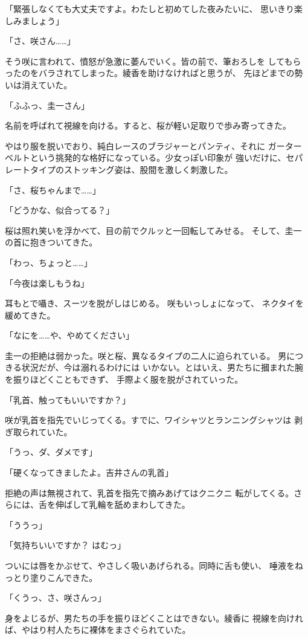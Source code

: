 ﻿\documentclass[
    book,tate,
    line_length=30zw,
    jafontsize=12pt,
    paper=b5j,
    landscape,
    ]{jlreq}
\begin{document}
「緊張しなくても大丈夫ですよ。わたしと初めてした夜みたいに、
思いきり楽しみましょう」

「さ、咲さん……」

そう咲に言われて、憤怒が急激に萎んでいく。皆の前で、筆おろしを
してもらったのをバラされてしまった。綾香を助けなければと思うが、
先ほどまでの勢いは消えていた。

「ふふっ、圭一さん」

名前を呼ばれて視線を向ける。すると、桜が軽い足取りで歩み寄ってきた。

やはり服を脱いでおり、純白レースのブラジャーとパンティ、それに
ガーターベルトという挑発的な格好になっている。少女っぽい印象が
強いだけに、セパレートタイプのストッキング姿は、股間を激しく刺激した。

「さ、桜ちゃんまで……」

「どうかな、似合ってる？」

桜は照れ笑いを浮かべて、目の前でクルッと一回転してみせる。
そして、圭一の首に抱きついてきた。

「わっ、ちょっと……」

「今夜は楽しもうね」

耳もとで囁き、スーツを脱がしはじめる。 咲もいっしょになって、
ネクタイを緩めてきた。

「なにを……や、やめてください」

圭一の拒絶は弱かった。咲と桜、異なるタイプの二人に迫られている。
男につきる状況だが、今は溺れるわけには
いかない。とはいえ、男たちに摑まれた腕を振りほどくこともできず、
手際よく服を脱がされていった。

「乳首、触ってもいいですか？」

咲が乳首を指先でいじってくる。すでに、ワイシャツとランニングシャツは
剥ぎ取られていた。

「うっ、ダ、ダメです」

「硬くなってきましたよ。吉井さんの乳首」

拒絶の声は無視されて、乳首を指先で摘みあげてはクニクニ
転がしてくる。さらには、舌を伸ばして乳輪を舐めまわしてきた。

「ううっ」

「気持ちいいですか？ はむっ」

ついには唇をかぶせて、やさしく吸いあげられる。同時に舌も使い、
唾液をねっとり塗りこんできた。

「くうっ、さ、咲さんっ」

身をよじるが、男たちの手を振りほどくことはできない。綾香に
視線を向ければ、やはり村人たちに裸体をまさぐられていた。
\end{document}
